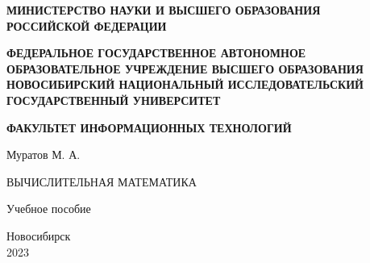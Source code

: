 \documentclass[17pt, a4paper]{extarticle}
\begin{document}
\newcommand{\headerHead}[1]{ {\fontsize{12pt}{0}\bfseries
	\MakeUppercase{#1} } }

\begin{titlepage}
	\null\vfill

	\begin{center}
		\headerHead{Министерство науки и высшего образования \\
		Российской Федерации \\} \leavevmode

	\headerHead{Федеральное Государственное Автономное \\
		образовательное учреждение высшего образования \\
		новосибирский национальный исследовательский
		государственный университет \\} \leavevmode

	\headerHead{Факультет информационных технологий \\} \leavevmode

		\vskip 3cm

		{\large Муратов М. А.}
		\vskip 1cm

		{\huge\MakeUppercase{Вычислительная математика}}
		\vskip 2cm

		{\large Учебное пособие}
	
		\vskip 7cm

		Новосибирск\\2023
	\end{center}
	\hfill
\end{titlepage}
\end{document}
